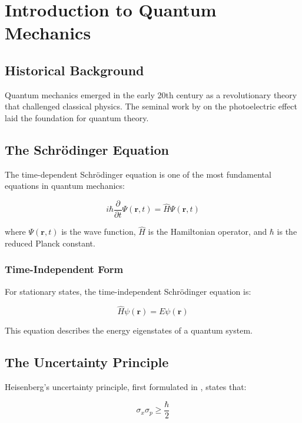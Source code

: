 \chapter{Introduction to Quantum Mechanics}

\section{Historical Background}

Quantum mechanics emerged in the early 20th century as a revolutionary theory that challenged classical physics. The seminal work by \cite{einstein1905} on the photoelectric effect laid the foundation for quantum theory.

\section{The Schrödinger Equation}

The time-dependent Schrödinger equation is one of the most fundamental equations in quantum mechanics:

\begin{equation}
i\hbar \frac{\partial}{\partial t} \Psi(\mathbf{r}, t) = \hat{H} \Psi(\mathbf{r}, t)
\end{equation}

where $\Psi(\mathbf{r}, t)$ is the wave function, $\hat{H}$ is the Hamiltonian operator, and $\hbar$ is the reduced Planck constant.

\subsection{Time-Independent Form}

For stationary states, the time-independent Schrödinger equation is:

\begin{equation}
\hat{H} \psi(\mathbf{r}) = E \psi(\mathbf{r})
\end{equation}

This equation describes the energy eigenstates of a quantum system.

\section{The Uncertainty Principle}

Heisenberg's uncertainty principle, first formulated in \cite{heisenberg1927}, states that:

\begin{equation}
\sigma_x \sigma_p \geq \frac{\hbar}{2}
\end{equation}

